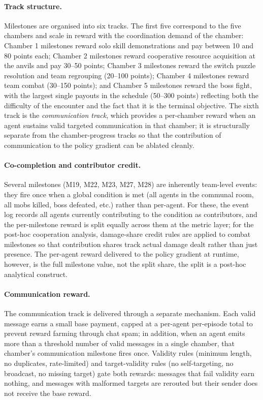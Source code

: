 \documentclass{article}
\theoremstyle{plain}
\theoremstyle{definition}
\theoremstyle{remark}
\begin{document}
\paragraph{Track structure.}
Milestones are organised into six tracks. The first five correspond to the five chambers and scale in reward with the coordination demand of the chamber: Chamber 1 milestones reward solo skill demonstrations and pay between 10 and 80 points each; Chamber 2 milestones reward cooperative resource acquisition at the anvils and pay 30--50 points; Chamber 3 milestones reward the switch puzzle resolution and team regrouping (20--100 points); Chamber 4 milestones reward team combat (30--150 points); and Chamber 5 milestones reward the boss fight, with the largest single payouts in the schedule (50--300 points) reflecting both the difficulty of the encounter and the fact that it is the terminal objective. The sixth track is the \emph{communication track}, which provides a per-chamber reward when an agent sustains valid targeted communication in that chamber; it is structurally separate from the chamber-progress tracks so that the contribution of communication to the policy gradient can be ablated cleanly.

\paragraph{Co-completion and contributor credit.}
Several milestones (M19, M22, M23, M27, M28) are inherently team-level events: they fire once when a global condition is met (all agents in the communal room, all mobs killed, boss defeated, etc.) rather than per-agent. For these, the event log records all agents currently contributing to the condition as contributors, and the per-milestone reward is split equally across them at the metric layer; for the post-hoc cooperation analysis, damage-share credit rules are applied to combat milestones so that contribution shares track actual damage dealt rather than just presence. The per-agent reward delivered to the policy gradient at runtime, however, is the full milestone value, not the split share, the split is a post-hoc analytical construct.

\paragraph{Communication reward.}
The communication track is delivered through a separate mechanism. Each valid message earns a small base payment, capped at a per-agent per-episode total to prevent reward farming through chat spam; in addition, when an agent emits more than a threshold number of valid messages in a single chamber, that chamber's communication milestone fires once. Validity rules (minimum length, no duplicates, rate-limited) and target-validity rules (no self-targeting, no broadcast, no missing target) gate both rewards: messages that fail validity earn nothing, and messages with malformed targets are rerouted but their sender does not receive the base reward.
\end{document}

